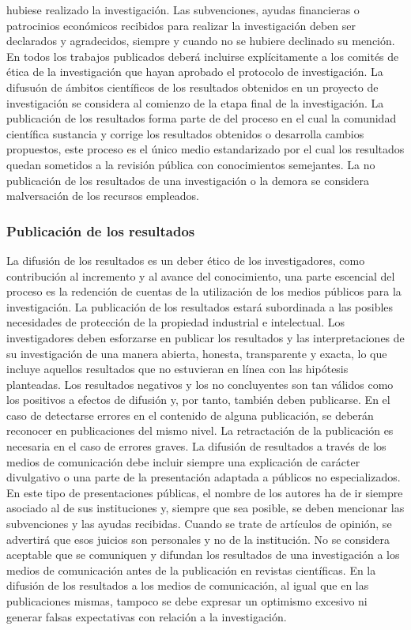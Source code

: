 hubiese realizado la investigación. Las subvenciones, ayudas financieras o patrocinios económicos
recibidos para realizar la investigación deben ser declarados y agradecidos, siempre y cuando no se
hubiere declinado su mención. En todos los trabajos publicados deberá incluirse explícitamente a
los comités de ética de la investigación que hayan aprobado el protocolo de investigación.
La difusuón de ámbitos científicos de los resultados obtenidos en un proyecto de investigación se considera al comienzo de la etapa
final de la investigación. La publicación de los resultados forma parte de del proceso en el cual la comunidad científica 
sustancia y corrige los resultados obtenidos o desarrolla cambios propuestos, este proceso es el único medio estandarizado por el cual
los resultados quedan sometidos a la revisión pública con conocimientos semejantes. La no publicación de los resultados de una investigación
o la demora se considera malversación de los recursos empleados.
\subsubsection{Publicación de los resultados}
La difusión de los resultados es un deber ético de los investigadores, como contribución al incremento
y al avance del conocimiento, una parte escencial del proceso es la redención de cuentas de la utilización 
de los medios públicos para la investigación. La publicación de los resultados estará subordinada a las posibles necesidades de protección 
de la propiedad industrial e intelectual. Los investigadores deben esforzarse en publicar los resultados y las interpretaciones de su
investigación de una manera abierta, honesta, transparente y exacta, lo que incluye aquellos
resultados que no estuvieran en línea con las hipótesis planteadas. Los resultados negativos y los no
concluyentes son tan válidos como los positivos a efectos de difusión y, por tanto, también deben
publicarse. En el caso de detectarse errores en el contenido de alguna publicación, se deberán reconocer en
publicaciones del mismo nivel. La retractación de la publicación es necesaria en el caso de errores
graves. La difusión de resultados a través de los medios de comunicación debe incluir siempre una
explicación de carácter divulgativo o una parte de la presentación adaptada a públicos no
especializados. En este tipo de presentaciones públicas, el nombre de los autores ha de ir siempre
asociado al de sus instituciones y, siempre que sea posible, se deben mencionar las subvenciones y
las ayudas recibidas. Cuando se trate de artículos de opinión, se advertirá que esos juicios son
personales y no de la institución. No se considera aceptable que se comuniquen y difundan los
resultados de una investigación a los medios de comunicación antes de la publicación en revistas
científicas. En la difusión de los resultados a los medios de comunicación, al igual que en las
publicaciones mismas, tampoco se debe expresar un optimismo excesivo ni generar falsas
expectativas con relación a la investigación.